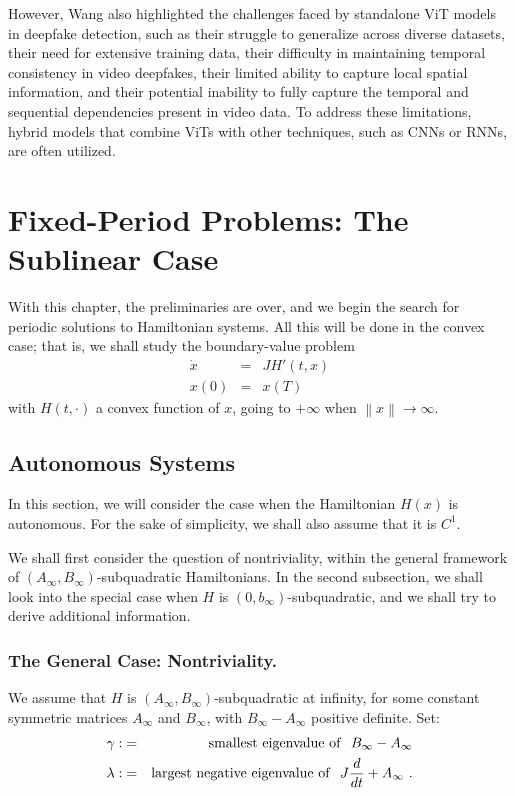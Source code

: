 \documentclass{svproc}
\begin{document}
However, Wang also highlighted the challenges faced by standalone ViT models in deepfake detection, such as their struggle to generalize across diverse datasets, their need for extensive training data, their difficulty in maintaining temporal consistency in video deepfakes, their limited ability to capture local spatial information, and their potential inability to fully capture the temporal and sequential dependencies present in video data. To address these limitations, hybrid models that combine ViTs with other techniques, such as CNNs or RNNs, are often utilized.

    


\section{Fixed-Period Problems: The Sublinear Case}
%
With this chapter, the preliminaries are over, and we begin the search
for periodic solutions to Hamiltonian systems. All this will be done in
the convex case; that is, we shall study the boundary-value problem
\begin{eqnarray*}
  \dot{x}&=&JH' (t,x)\\
  x(0) &=& x(T)
\end{eqnarray*}
with $H(t,\cdot)$ a convex function of $x$, going to $+\infty$ when
$\left\|x\right\| \to \infty$.

%
\subsection{Autonomous Systems}
%
In this section, we will consider the case when the Hamiltonian $H(x)$
is autonomous. For the sake of simplicity, we shall also assume that it
is $C^{1}$.

We shall first consider the question of nontriviality, within the
general framework of
$\left(A_{\infty},B_{\infty}\right)$-subquadratic Hamiltonians. In
the second subsection, we shall look into the special case when $H$ is
$\left(0,b_{\infty}\right)$-subquadratic,
and we shall try to derive additional information.
%
\subsubsection{The General Case: Nontriviality.}
%
We assume that $H$ is
$\left(A_{\infty},B_{\infty}\right)$-sub\-qua\-dra\-tic at infinity,
for some constant symmetric matrices $A_{\infty}$ and $B_{\infty}$,
with $B_{\infty}-A_{\infty}$ positive definite. Set:
\begin{eqnarray}
\gamma :&=&{\rm smallest\ eigenvalue\ of}\ \ B_{\infty} - A_{\infty} \\
  \lambda : &=& {\rm largest\ negative\ eigenvalue\ of}\ \
  J \frac{d}{dt} +A_{\infty}\ .
\end{eqnarray}
\end{document}
